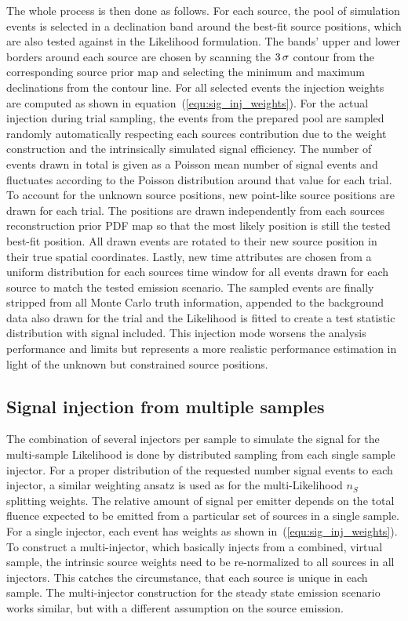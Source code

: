The whole process is then done as follows.
For each source, the pool of simulation events is selected in a declination band around the best-fit source positions, which are also tested against in the Likelihood formulation.
The bands' upper and lower borders around each source are chosen by scanning the $\num{3}\,\sigma$ contour from the corresponding source prior map and selecting the minimum and maximum declinations from the contour line.
For all selected events the injection weights are computed as shown in equation~(\ref{equ:sig_inj_weights}).
For the actual injection during trial sampling, the events from the prepared pool are sampled randomly automatically respecting each sources contribution due to the weight construction and the intrinsically simulated signal efficiency.
The number of events drawn in total is given as a Poisson mean number of signal events and fluctuates according to the Poisson distribution around that value for each trial.
To account for the unknown source positions, new point-like source positions are drawn for each trial.
The positions are drawn independently from each sources reconstruction prior PDF map so that the most likely position is still the tested best-fit position.
All drawn events are rotated to their new source position in their true spatial coordinates.
Lastly, new time attributes are chosen from a uniform distribution for each sources time window for all events drawn for each source to match the tested emission scenario.
The sampled events are finally stripped from all Monte Carlo truth information, appended to the background data also drawn for the trial and the Likelihood is fitted to create a test statistic distribution with signal included.
This injection mode worsens the analysis performance and limits but represents a more realistic performance estimation in light of the unknown but constrained source positions.


\subsection{Signal injection from multiple samples}
The combination of several injectors per sample to simulate the signal for the multi-sample Likelihood is done by distributed sampling from each single sample injector.
For a proper distribution of the requested number signal events to each injector, a similar weighting ansatz is used as for the multi-Likelihood $n_S$ splitting weights.
The relative amount of signal per emitter depends on the total fluence expected to be emitted from a particular set of sources in a single sample.
For a single injector, each event has weights as shown in~(\ref{equ:sig_inj_weights}).
To construct a multi-injector, which basically injects from a combined, virtual sample, the intrinsic source weights need to be re-normalized to all sources in all injectors.
This catches the circumstance, that each source is unique in each sample.
The multi-injector construction for the steady state emission scenario works similar, but with a different assumption on the source emission.

